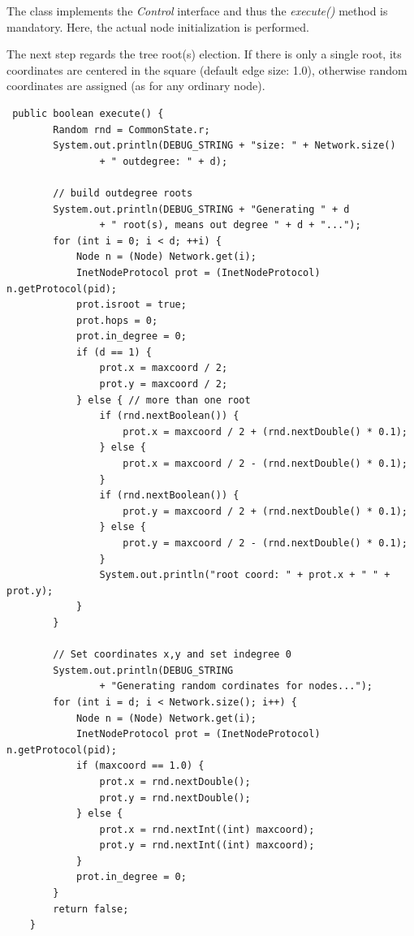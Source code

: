 \documentclass[a4paper,12pt]{article}
\begin{document}
The class implements the \emph{Control} interface and thus the
\emph{execute()} method is mandatory. Here, the actual node initialization
is performed.

The next step regards the tree root(s) election. If there is only a
single root, its coordinates are centered in the square (default edge
size: 1.0), otherwise
random coordinates are assigned (as for any ordinary node).

\footnotesize 
\begin{verbatim}
 public boolean execute() {
        Random rnd = CommonState.r;
        System.out.println(DEBUG_STRING + "size: " + Network.size()
                + " outdegree: " + d);

        // build outdegree roots
        System.out.println(DEBUG_STRING + "Generating " + d
                + " root(s), means out degree " + d + "...");
        for (int i = 0; i < d; ++i) {
            Node n = (Node) Network.get(i);
            InetNodeProtocol prot = (InetNodeProtocol) n.getProtocol(pid);
            prot.isroot = true;
            prot.hops = 0;
            prot.in_degree = 0;
            if (d == 1) {
                prot.x = maxcoord / 2;
                prot.y = maxcoord / 2;
            } else { // more than one root
                if (rnd.nextBoolean()) {
                    prot.x = maxcoord / 2 + (rnd.nextDouble() * 0.1);
                } else {
                    prot.x = maxcoord / 2 - (rnd.nextDouble() * 0.1);
                }
                if (rnd.nextBoolean()) {
                    prot.y = maxcoord / 2 + (rnd.nextDouble() * 0.1);
                } else {
                    prot.y = maxcoord / 2 - (rnd.nextDouble() * 0.1);
                }
                System.out.println("root coord: " + prot.x + " " + prot.y);
            }
        }

        // Set coordinates x,y and set indegree 0
        System.out.println(DEBUG_STRING
                + "Generating random cordinates for nodes...");
        for (int i = d; i < Network.size(); i++) {
            Node n = (Node) Network.get(i);
            InetNodeProtocol prot = (InetNodeProtocol) n.getProtocol(pid);
            if (maxcoord == 1.0) {
                prot.x = rnd.nextDouble();
                prot.y = rnd.nextDouble();
            } else {
                prot.x = rnd.nextInt((int) maxcoord);
                prot.y = rnd.nextInt((int) maxcoord);
            }
            prot.in_degree = 0;
        }
        return false;
    }
\end{verbatim}
\normalsize
\end{document}
